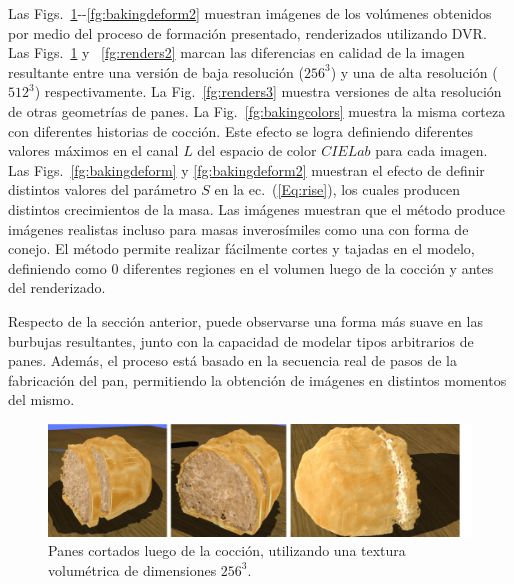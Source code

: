 Las Figs.~\ref{fg:renders}{-{}-}\ref{fg:bakingdeform2} muestran imágenes de los volúmenes obtenidos por medio del proceso de formación presentado, renderizados utilizando DVR.
Las Figs.~\ref{fg:renders} y ~\ref{fg:renders2} marcan las diferencias en calidad de la imagen resultante entre una versión de baja resolución ($256^{3}$) y una de alta resolución ($512^{3}$) respectivamente.
La Fig.~\ref{fg:renders3} muestra versiones de alta resolución de otras geometrías de panes.
La Fig.~\ref{fg:bakingcolors} muestra la misma corteza con diferentes historias de cocción.
Este efecto se logra definiendo diferentes valores máximos en el canal $L$ del espacio de color $CIELab$ para cada imagen.
Las Figs.~\ref{fg:bakingdeform} y \ref{fg:bakingdeform2} muestran el efecto de definir distintos valores del parámetro $S$ en la ec.~(\ref{Eq:rise}), los cuales producen distintos crecimientos de la masa.
Las imágenes muestran que el método produce imágenes realistas incluso para masas inverosímiles como una con forma de conejo.
El método permite realizar fácilmente cortes y tajadas en el modelo, definiendo como $0$ diferentes regiones en el volumen luego de la cocción y antes del renderizado.

Respecto de la sección anterior, puede observarse una forma más suave en las burbujas resultantes, junto con la capacidad de modelar tipos arbitrarios de panes.
Además, el proceso está basado en la secuencia real de pasos de la fabricación del pan, permitiendo la obtención de imágenes en distintos momentos del mismo.

\begin{figure}[!ht]
\begin{center}
\includegraphics[width=13cm]{figures/Fig10}
\caption{Panes cortados luego de la cocción, utilizando una textura volumétrica de dimensiones $256^{3}$.}
\label{fg:renders}
\end{center}
\end{figure}

